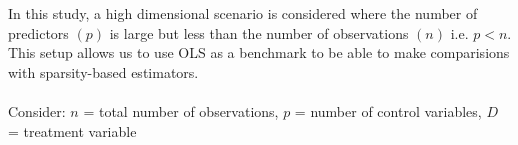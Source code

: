 In this study, a high dimensional scenario is considered where the number of predictors $(p)$ is large but less than the number of observations $(n)$ i.e. $p<n$. This setup allows us to use OLS as a benchmark to be able to make comparisions with sparsity-based estimators. \\
\\
Consider:
$ n $ = total number of observations,
$ p $ = number of control variables,
$ D $ = treatment variable 

